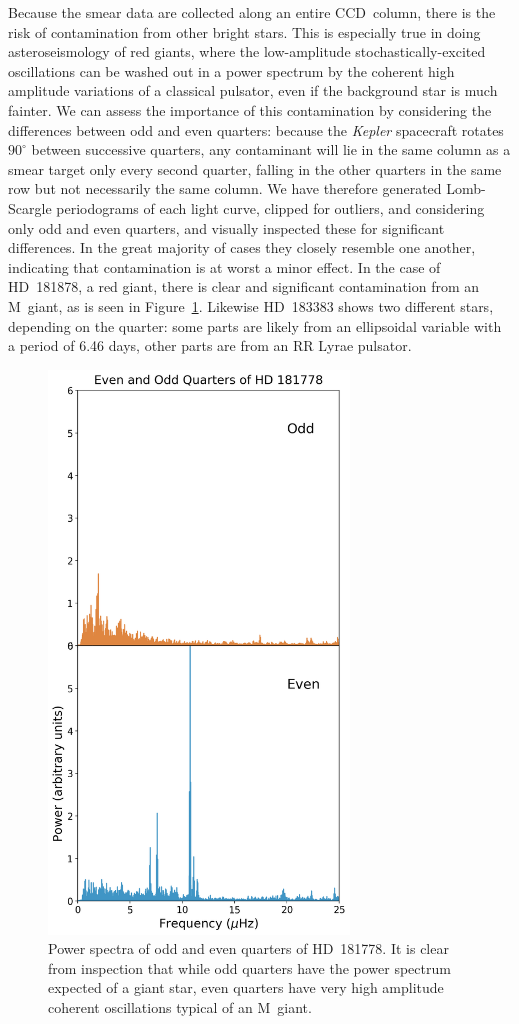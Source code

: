 \documentclass[a4paper,fleqn,usenatbib]{mnras}
\newcommand{\kepler}{\emph{Kepler}\xspace}
\begin{document}
Because the smear data are collected along an entire CCD~column, there is the risk of contamination from other bright stars. This is especially true in doing asteroseismology of red giants, where the low-amplitude stochastically-excited oscillations can be washed out in a power spectrum by the coherent high amplitude variations of a classical pulsator, even if the background star is much fainter. We can assess the importance of this contamination by considering the differences between odd and even quarters: because the \kepler spacecraft rotates $90^{\circ}$ between successive quarters, any contaminant will lie in the same column as a smear target only every second quarter, falling in the other quarters in the same row but not necessarily the same column. We have therefore generated Lomb-Scargle periodograms \citep{lomb,scargle} of each light curve, clipped for outliers, and considering only odd and even quarters, and visually inspected these for significant differences. In the great majority of cases they closely resemble one another, indicating that contamination is at worst a minor effect. In the case of HD~181878, a red giant, there is clear and significant contamination from an M~giant, as is seen in Figure~\ref{contamination}. Likewise HD~183383 shows two different stars, depending on the quarter: some parts are likely from an ellipsoidal variable with a period of 6.46 days, other parts are from an RR Lyrae pulsator.


\begin{figure}
\noindent\includegraphics[width=8cm,keepaspectratio]{contam_HD_181778.png}

\caption{\label{contamination}
Power spectra of odd and even quarters of HD~181778. It is clear from inspection that while odd quarters have the power spectrum expected of a giant star, even quarters have very high amplitude coherent oscillations typical of an M~giant.}
\end{figure}
\end{document}
